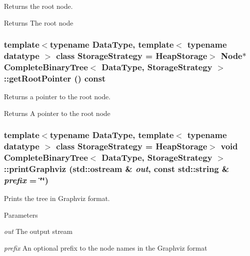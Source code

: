 Returns the root node. 

\begin{DoxyReturn}{Returns}
The root node 
\end{DoxyReturn}
\hypertarget{class_complete_binary_tree_a0c56d34b6281450f6e31b1b745dd2879}{
\subsubsection[{getRootPointer}]{\setlength{\rightskip}{0pt plus 5cm}template$<$typename DataType, template$<$ typename datatype $>$ class StorageStrategy = HeapStorage$>$ {\bf Node}$\ast$ {\bf CompleteBinaryTree}$<$ DataType, StorageStrategy $>$::getRootPointer () const}}
\label{class_complete_binary_tree_a0c56d34b6281450f6e31b1b745dd2879}


Returns a pointer to the root node. 

\begin{DoxyReturn}{Returns}
A pointer to the root node 
\end{DoxyReturn}
\hypertarget{class_complete_binary_tree_a5fa6e7c4fa1985f79ce83361384e69ea}{
\subsubsection[{printGraphviz}]{\setlength{\rightskip}{0pt plus 5cm}template$<$typename DataType, template$<$ typename datatype $>$ class StorageStrategy = HeapStorage$>$ void {\bf CompleteBinaryTree}$<$ DataType, StorageStrategy $>$::printGraphviz (std::ostream \& {\em out}, \/  const std::string \& {\em prefix} = {\ttfamily \char`\"{}\char`\"{}})}}
\label{class_complete_binary_tree_a5fa6e7c4fa1985f79ce83361384e69ea}


Prints the tree in Graphviz format. 


\begin{DoxyParams}{Parameters}
\item[{\em out}]The output stream \item[{\em prefix}]An optional prefix to the node names in the Graphviz format \end{DoxyParams}


